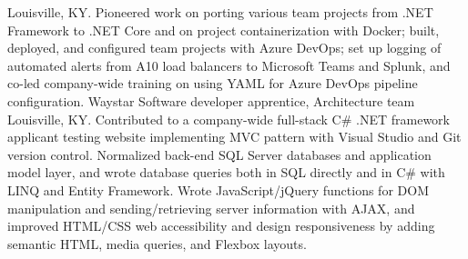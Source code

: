 {Louisville, KY. Pioneered work on porting various team projects from .NET Framework to .NET Core and on project containerization with Docker; built, deployed, and configured team projects with Azure DevOps; set up logging of automated alerts from A10 load balancers to Microsoft Teams and Splunk, and co-led company-wide training on using YAML for Azure DevOps pipeline configuration.
}
{Waystar}
{Software developer apprentice, Architecture team}
{Louisville, KY. Contributed to a company-wide full-stack C\# .NET framework applicant testing website implementing MVC pattern with Visual Studio and Git version control. Normalized back-end SQL Server databases and application model layer, and wrote database queries both in SQL directly and in C\# with LINQ and Entity Framework. Wrote JavaScript/jQuery functions for DOM manipulation and sending/retrieving server information with AJAX, and improved HTML/CSS web accessibility and design responsiveness by adding semantic HTML, media queries, and Flexbox layouts. }
